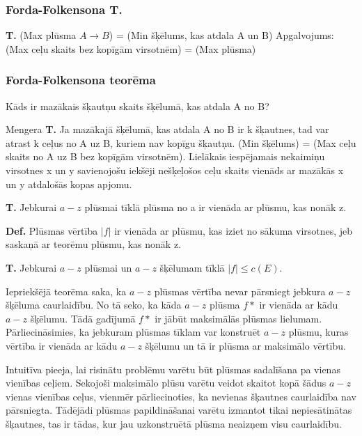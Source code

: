 \documentclass{article}
\begin{document}
\subsubsection{Forda-Folkensona T.}

\textbf{T. }(Max plūsma $A \to B$) = (Min šķēlums, kas atdala A un B)
Apgalvojums: (Max ceļu skaits bez kopīgām virsotnēm) = (Max plūsma)
\subsubsection{Forda-Folkensona teorēma}

Kāds ir mazākais šķautņu skaits šķēlumā, kas atdala A no B?

Mengera \textbf{T. } Ja mazākajā šķēlumā, kas atdala A no B ir k šķautnes, tad var atrast k ceļus no A uz B, kuriem nav kopīgu šķautņu.  (Min šķēlums) = (Max ceļu skaits no A uz B bez kopīgām virsotnēm). Lielākais iespējamais nekaimiņu virsotnes x un y savienojošu iekšēji nešķeļošos ceļu skaits vienāds ar mazākās x un y atdalošās kopas apjomu.


\textbf{T. } Jebkurai $a-z$ plūsmai tīklā plūsma no a ir vienāda ar plūsmu, kas nonāk z.

\textbf{Def.} Plūsmas vērtība $|f |$ ir vienāda ar plūsmu, kas iziet no sākuma virsotnes, jeb saskaņā ar teorēmu plūsmu, kas nonāk z.

\textbf{T. }Jebkurai $a-z$ plūsmai un $ a-z$ šķēlumam tīklā $|f | \le c(E )$.

Iepriekšējā teorēma saka, ka $a-z$ plūsmas vērtība nevar pārsniegt jebkura $a-z$ šķēluma caurlaidību. No tā seko, ka kāda $a-z$ plūsma $f*$ ir vienāda ar kādu $a-z$ šķēlumu. Tādā gadījumā $f*$ ir jābūt maksimālās plūsmas lielumam. Pārliecināsimies, ka jebkuram plūsmas tīklam var konstruēt $a-z$ plūsmu, kuras vērtība ir vienāda ar kādu $a-z$ šķēlumu un tā ir plūsma ar maksimālo vērtību.

Intuitīva pieeja, lai risinātu problēmu varētu būt plūsmas sadalīšana pa vienas vienības ceļiem.  Sekojoši maksimālo plūsu varētu veidot skaitot kopā šādus $a-z$ vienas vienības ceļus, vienmēr pārliecinoties, ka nevienas šķautnes caurlaidība nav pārsniegta.  Tādējādi plūsmas papildināšanai varētu izmantot tikai nepiesātinātas šķautnes, tas ir tādas, kur jau uzkonstruētā plūsma neaizņem visu caurlaidību.
\end{document}
